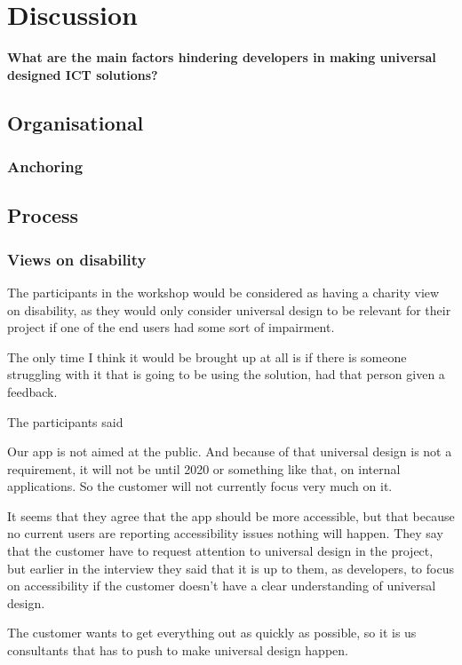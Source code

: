 \chapter{Discussion} \label{discussionchap}
\textbf{What are the main factors hindering developers in making universal designed ICT solutions?}

\section{Organisational}
\subsection{Anchoring}

\section{Process}
\subsection{Views on disability}
The participants in the workshop would be considered as having a charity view on disability, as they would only consider universal design to be relevant for their project if one of the end users had some sort of impairment. 

\begin{displayquote}
The only time I think it would be brought up at all is if there is someone struggling with it that is going to be using the solution, had that person given a feedback.
\end{displayquote}

The participants said
\begin{displayquote}
    Our app is not aimed at the public. And because of that universal design is not a requirement, it will not be until 2020 or something like that, on internal applications. So the customer will not currently focus very much on it.
\end{displayquote}

It seems that they agree that the app should be more accessible, but that because no current users are reporting accessibility issues nothing will happen. They say that the customer have to request attention to universal design in the project, but earlier in the interview they said that it is up to them, as developers, to focus on accessibility if the customer doesn't have a clear understanding of universal design.

\begin{displayquote}
    The customer wants to get everything out as quickly as possible, so it is us consultants that has to push to make universal design happen.
\end{displayquote}

